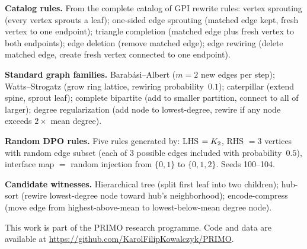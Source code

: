 \documentclass{../shared/primo}
\begin{document}
\textbf{Catalog rules.} From the complete catalog of GPI rewrite rules: vertex sprouting (every vertex sprouts a leaf); one-sided edge sprouting (matched edge kept, fresh vertex to one endpoint); triangle completion (matched edge plus fresh vertex to both endpoints); edge deletion (remove matched edge); edge rewiring (delete matched edge, create fresh vertex connected to one endpoint).

\textbf{Standard graph families.} Barab\'asi--Albert ($m = 2$ new edges per step); Watts--Strogatz (grow ring lattice, rewiring probability~$0.1$); caterpillar (extend spine, sprout leaf); complete bipartite (add to smaller partition, connect to all of larger); degree regularization (add node to lowest-degree, rewire if any node exceeds $2\times$ mean degree).

\textbf{Random DPO rules.} Five rules generated by: LHS $= K_{2}$, RHS $= 3$ vertices with random edge subset (each of 3 possible edges included with probability~$0.5$), interface map $=$ random injection from $\{0,1\}$ to $\{0,1,2\}$. Seeds 100--104.

\textbf{Candidate witnesses.} Hierarchical tree (split first leaf into two children); hub-sort (rewire lowest-degree node toward hub's neighborhood); encode-compress (move edge from highest-above-mean to lowest-below-mean degree node).


\begin{acknowledgments}
This work is part of the PRIMO research programme. Code and data are available at \url{https://github.com/KarolFilipKowalczyk/PRIMO}.
\end{acknowledgments}



\end{document}
